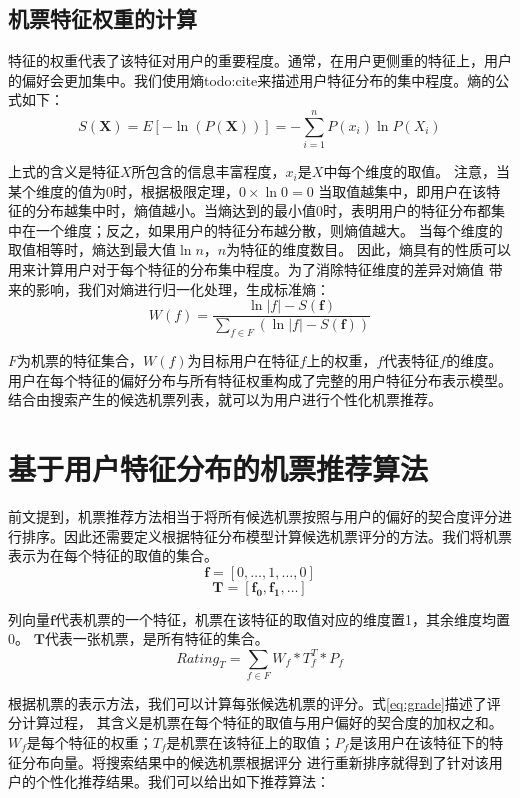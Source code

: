 \subsection{机票特征权重的计算}

特征的权重代表了该特征对用户的重要程度。通常，在用户更侧重的特征上，用户的偏好会更加集中。我们使用熵todo:cite来描述用户特征分布的集中程度。熵的公式如下：
\begin{equation}
\label{eq:entropy}
	S(\mathbf{X}) = E[-\ln (P(\mathbf{X}))] = - \sum_{i=1}^n P(x_i)\ln P(X_i)
\end{equation}\par

上式的含义是特征$X$所包含的信息丰富程度，$x_i$是$X$中每个维度的取值。
注意，当某个维度的值为$0$时，根据极限定理，$0 \times \ln 0 = 0$
当取值越集中，即用户在该特征的分布越集中时，熵值越小。当熵达到的最小值$0$时，表明用户的特征分布都集中在一个维度；反之，如果用户的特征分布越分散，则熵值越大。
当每个维度的取值相等时，熵达到最大值$\ln n$，$n$为特征的维度数目。
因此，熵具有的性质可以用来计算用户对于每个特征的分布集中程度。为了消除特征维度的差异对熵值
带来的影响，我们对熵进行归一化处理，生成标准熵：
\begin{equation}
  W(f) = \frac{\ln |f| - S(\mathbf{f})}{\sum_{f \in F}(\ln |f| - S(\mathbf{f}))}
\end{equation}\par
$F$为机票的特征集合，$W(f)$为目标用户在特征$f$上的权重，$f$代表特征$f$的维度。用户在每个特征的偏好分布与所有特征权重构成了完整的用户特征分布表示模型。结合由搜索产生的候选机票列表，就可以为用户进行个性化机票推荐。

\section{基于用户特征分布的机票推荐算法}
\label{sec:base_rec}

前文提到，机票推荐方法相当于将所有候选机票按照与用户的偏好的契合度评分进行排序。因此还需要定义根据特征分布模型计算候选机票评分的方法。我们将机票表示为在每个特征的取值的集合。
\begin{equation}
  \mathbf{f} = [0,\dots,1,\dots,0]
\end{equation}
\begin{equation}
  \mathbf{T} = [\mathbf{f_0},\mathbf{f_1},\dots]
\end{equation}\par
列向量$\mathbf{f}$代表机票的一个特征，机票在该特征的取值对应的维度置1，其余维度均置0。 $\mathbf{T}$代表一张机票，是所有特征的集合。
\begin{equation}
	\label{eq:grade}
	Rating_T = \sum_{f \in F}W_f*T_f^T*P_f
\end{equation}\par
根据机票的表示方法，我们可以计算每张候选机票的评分。式\ref{eq:grade}描述了评分计算过程，
其含义是机票在每个特征的取值与用户偏好的契合度的加权之和。$W_f$是每个特征的权重；$T_f$是机票在该特征上的取值；$P_f$是该用户在该特征下的特征分布向量。将搜索结果中的候选机票根据评分
进行重新排序就得到了针对该用户的个性化推荐结果。我们可以给出如下推荐算法：\par

